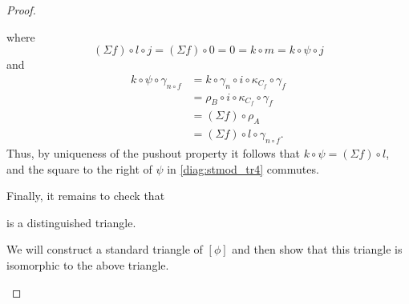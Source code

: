 \begin{proof}
\begin{enumerate}[label={(\bfseries TR\arabic*)}]
{\begin{center}
            \end{center}
            where
            \[
                (\Sigma f) \circ l \circ j = (\Sigma f) \circ 0 = 0 = k \circ m = k \circ \psi \circ j
            \]
            and
            \begin{align*}
                k \circ \psi \circ \gamma_{n \circ f} &= k \circ \gamma_n \circ i \circ \kappa_{C_f} \circ \gamma_f \\
                &= \rho_B \circ i \circ \kappa_{C_f} \circ \gamma_f \\
                &= (\Sigma f) \circ \rho_A \\
                &= (\Sigma f) \circ l \circ \gamma_{n \circ f}.
            \end{align*}
            Thus, by uniqueness of the pushout property it follows that \( k \circ \psi = (\Sigma f) \circ l \), and the square to the right of \( \psi \) in \autoref{diag:stmod_tr4} commutes.

            Finally, it remains to check that
            \begin{center}
            \end{center}
            is a distinguished triangle.

            We will construct a standard triangle of \( [\phi] \) and then show that this triangle is isomorphic to the above triangle.

}
\end{enumerate}
\end{proof}
